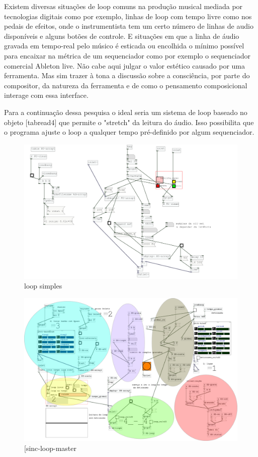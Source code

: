\documentclass{ppgmus}
\begin{document}
 Existem diversas situações de loop comuns na produção musical mediada por tecnologias digitais
como por exemplo, linhas de loop com tempo livre como nos pedais de efeitos, onde o instrumentista
tem um certo número de linhas de audio disponíveis e alguns botões de controle.
E situações em que a linha de áudio gravada em tempo-real pelo músico é esticada ou encolhida o mínimo
possível para encaixar na métrica de um sequenciador como por exemplo o sequenciador
comercial Ableton live. Não cabe aqui julgar o valor estético causado por uma ferramenta. Mas sim
trazer à tona a discussão sobre a consciência, por parte do compositor, da natureza da ferramenta 
e de como o pensamento composicional interage com essa interface.


Para a continuação dessa pesquisa o ideal seria um sistema de loop baseado no objeto 
[tabread4\texttildelow] que permite o "stretch" da leitura do áudio. Isso possibilita que o programa
ajuste o loop a qualquer tempo pré-definido por algum sequenciador.

\begin{figure}
\includegraphics[scale=.4]{sinc-looper}
\caption{loop simples}
\label{sinc-looper}
\end{figure}




\begin{figure}
\includegraphics[scale=.4]{loop-master}
\caption{[sinc-loop-master}
\label{loopmaster}
\end{figure}
\end{document}
